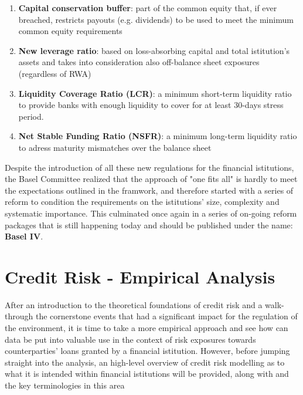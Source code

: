 \documentclass[a4paper,12pt]{article}
\begin{document}
        \begin{enumerate}
            \item \textbf{Capital conservation buffer}: part of the common equity that, if ever breached, restricts payouts (e.g. dividends) to be used to meet the minimum common equity requirements
            \item \textbf{New leverage ratio}: based on loss-absorbing capital and total istitution's assets and takes into consideration also off-balance sheet exposures (regardless of RWA)
            \item \textbf{Liquidity Coverage Ratio (LCR)}: a minimum short-term liquidity ratio to provide banks with enough liquidity to cover for at least 30-days stress period.
            \item \textbf{Net Stable Funding Ratio (NSFR)}: a minimum long-term liquidity ratio to adress maturity mismatches over the balance sheet
        \end{enumerate}

    Despite the introduction of all these new regulations for the financial istitutions, the Basel Committee realized that the approach of "one fits all" is hardly to meet 
    the expectations outlined in the framwork, and therefore started with a series of reform to condition the requirements on the istitutions' size, complexity and systematic importance.
    This culminated once again in a series of on-going reform packages that is still happening today and should be published under the name: \textbf{Basel IV}.
    \newline

    
    \pagebreak
    \section{Credit Risk - Empirical Analysis}

    After an introduction to the theoretical foundations of credit risk and a walk-through the cornerstone events that had a significant impact for the regulation of the environment,
    it is time to take a more empirical approach and see how can data be put into valuable use in the context of risk exposures towards counterparties' loans granted by a financial istitution.
    However, before jumping straight into the analysis, an high-level overview of credit risk modelling as to what it is intended within financial istitutions will be provided, along with and the key terminologies in this area
\end{document}
